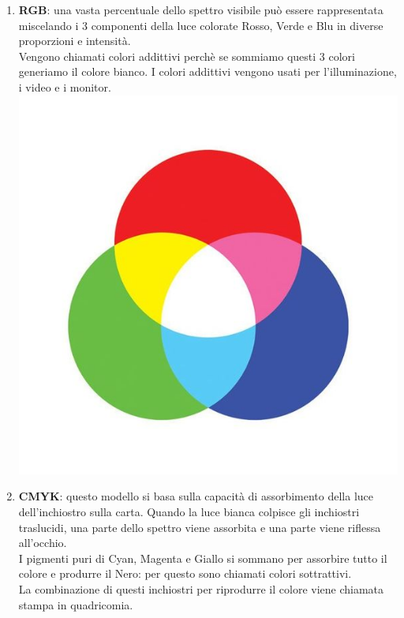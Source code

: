 \documentclass{article}
\begin{document}
\begin{enumerate}
\newpage
\item \textbf{RGB}: una vasta percentuale dello spettro visibile può essere rappresentata miscelando i 3 componenti della luce colorate Rosso, Verde e Blu in diverse proporzioni e intensità.\\
Vengono chiamati colori addittivi perchè se sommiamo questi 3 colori generiamo il colore bianco. I colori addittivi vengono usati per l'illuminazione, i video e i monitor.\\
\includegraphics[scale=0.5]{rgb}
\newpage
\item \textbf{CMYK}: questo modello si basa sulla capacità di assorbimento della luce dell'inchiostro sulla carta. Quando la luce bianca colpisce gli inchiostri traslucidi, una parte dello spettro viene assorbita e una parte viene riflessa all'occhio.\\ 
I pigmenti puri di Cyan, Magenta e Giallo si sommano per assorbire tutto il colore e produrre il Nero: per questo sono chiamati colori sottrattivi.\\ 
La combinazione di questi inchiostri per riprodurre il colore viene chiamata stampa in quadricomia.\\

\end{enumerate}
\end{document}
